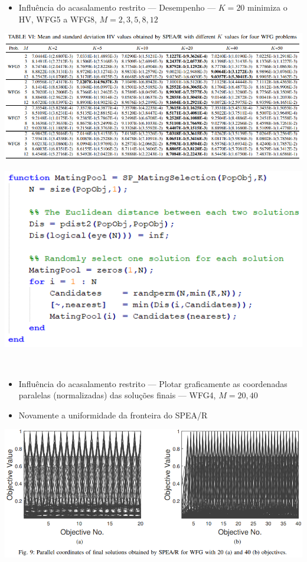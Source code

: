 \documentclass{rbfin}
\begin{document}
\newpage

\begin{itemize}
  \item Influência do acasalamento restrito --- Desempenho --- $K = 20$ minimiza o HV, WFG5 a WFG8, $M = 2,3,5,8,12$
\end{itemize}

\begin{center}
\includegraphics[scale=1]{table6}

\includegraphics[scale=1]{MatingSelection}
\end{center}

\newpage

$\,$

\vspace{30mm}

\begin{itemize}
  \item Influência do acasalamento restrito --- Plotar graficamente as coordenadas paralelas (normalizadas) das soluções finais --- WFG4, $M = 20, 40$
  \item Novamente a uniformidade da fronteira do SPEA/R
\end{itemize}

\begin{center}
\includegraphics[scale=1]{fig9}
\end{center}
\end{document}
